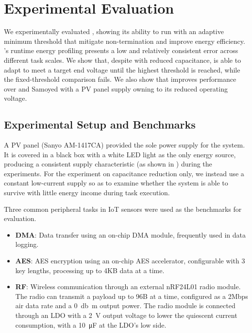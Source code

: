 \section{Experimental Evaluation} \label{sec:experiment}

We experimentally evaluated \nn{}, showing its ability to run with an adaptive minimum threshold that mitigate non-termination and improve energy efficiency. 
\nn{}'s runtime energy profiling presents a low and relatively consistent error across different task scales. 
We show that, despite with reduced capacitance, \nn{} is able to adapt  to meet a target end voltage  until the highest threshold is reached, while the fixed-threshold comparison \debs{} fails.
We also show that \nn{} improves performance over \debs{} and Samoyed with a PV panel supply owning to its reduced operating voltage. 

\subsection{Experimental Setup and Benchmarks}

A PV panel (Sanyo AM-1417CA) provided the sole power supply for the system. 
It is covered in a black box with a white LED light as the only energy source, producing a consistent supply characteristic (as shown in ) during the experiments.
For the experiment on capacitance reduction only, we instead use a constant low-current supply so as to examine whether the system is able to survive with little energy income during task execution. 

Three common peripheral tasks in IoT sensors were used as the benchmarks for evaluation. 
\begin{itemize}
    \item \textbf{DMA}: Data transfer using an on-chip DMA module, frequently used in data logging.
    \item \textbf{AES}: AES encryption using an on-chip AES accelerator, configurable with 3 key lengths, processing up to 4KB data at a time.
    \item \textbf{RF}:  Wireless communication through an external nRF24L01 radio module. 
    The radio can transmit a payload up to 96B at a time, configured as a 2Mbps air data rate and a \SI{0}{\decibel{m}} output power. 
    The radio module is connected through an LDO with a \SI{2}{\volt} output voltage to lower the quiescent current consumption, with a \SI{10}{\micro\farad} at the LDO's low side. 
\end{itemize}

